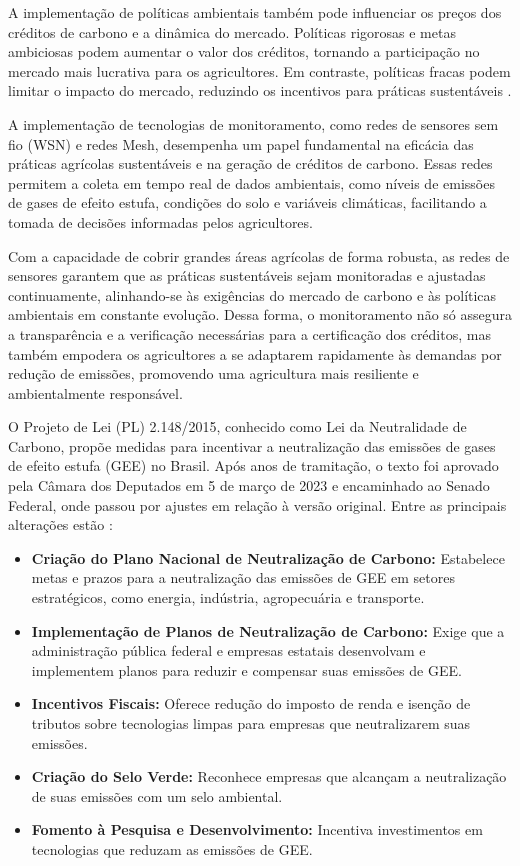 A implementação de políticas ambientais também pode influenciar os preços dos créditos de carbono e a dinâmica do mercado. Políticas rigorosas e metas ambiciosas podem aumentar o valor dos créditos, tornando a participação no mercado mais lucrativa para os agricultores. Em contraste, políticas fracas podem limitar o impacto do mercado, reduzindo os incentivos para práticas sustentáveis \cite{pizer2005}.

A implementação de tecnologias de monitoramento, como redes de sensores sem fio (WSN) e redes Mesh, desempenha um papel fundamental na eficácia das práticas agrícolas sustentáveis e na geração de créditos de carbono. Essas redes permitem a coleta em tempo real de dados ambientais, como níveis de emissões de gases de efeito estufa, condições do solo e variáveis climáticas, facilitando a tomada de decisões informadas pelos agricultores. 

Com a capacidade de cobrir grandes áreas agrícolas de forma robusta, as redes de sensores garantem que as práticas sustentáveis sejam monitoradas e ajustadas continuamente, alinhando-se às exigências do mercado de carbono e às políticas ambientais em constante evolução. Dessa forma, o monitoramento não só assegura a transparência e a verificação necessárias para a certificação dos créditos, mas também empodera os agricultores a se adaptarem rapidamente às demandas por redução de emissões, promovendo uma agricultura mais resiliente e ambientalmente responsável.

O Projeto de Lei (PL) 2.148/2015, conhecido como Lei da Neutralidade de Carbono, propõe medidas para incentivar a neutralização das emissões de gases de efeito estufa (GEE) no Brasil. Após anos de tramitação, o texto foi aprovado pela Câmara dos Deputados em 5 de março de 2023 e encaminhado ao Senado Federal, onde passou por ajustes em relação à versão original. Entre as principais alterações estão \cite{camara2023PL2148}: 

\begin{itemize}
    \item \textbf{Criação do Plano Nacional de Neutralização de Carbono:} Estabelece metas e prazos para a neutralização das emissões de GEE em setores estratégicos, como energia, indústria, agropecuária e transporte. 
    \item \textbf{Implementação de Planos de Neutralização de Carbono:} Exige que a administração pública federal e empresas estatais desenvolvam e implementem planos para reduzir e compensar suas emissões de GEE. 
    \item \textbf{Incentivos Fiscais:} Oferece redução do imposto de renda e isenção de tributos sobre tecnologias limpas para empresas que neutralizarem suas emissões. 
    \item \textbf{Criação do Selo Verde:} Reconhece empresas que alcançam a neutralização de suas emissões com um selo ambiental. 
    \item \textbf{Fomento à Pesquisa e Desenvolvimento:} Incentiva investimentos em tecnologias que reduzam as emissões de GEE. 
\end{itemize}


